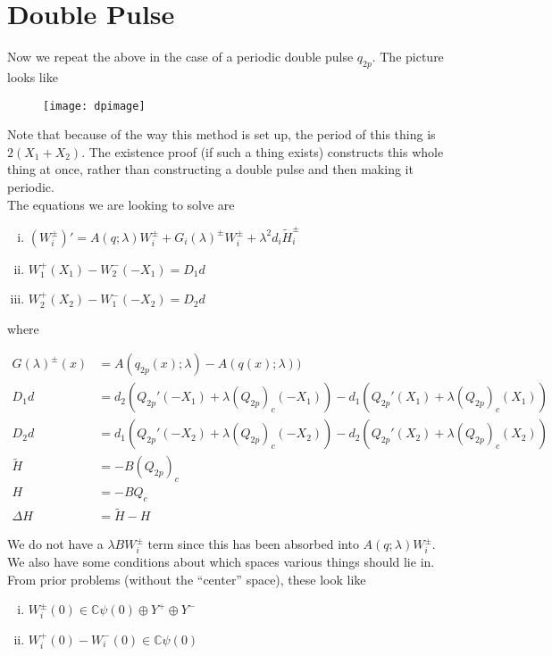 \documentclass[12pt]{article}
\def\C{{\mathbb C}}
\begin{document}
\section*{Double Pulse}

Now we repeat the above in the case of a periodic double pulse $q_{2p}$. The picture looks like

\begin{figure}[H]
\texttt{[image: dpimage]}
\end{figure}

Note that because of the way this method is set up, the period of this thing is $2(X_1 + X_2)$. The existence proof (if such a thing exists) constructs this whole thing at once, rather than constructing a double pulse and then making it periodic. \\

The equations we are looking to solve are

\begin{enumerate}[(i)]
\item $(W_i^\pm)' = A(q; \lambda) W_i^\pm + G_i(\lambda)^\pm W_i^\pm + \lambda^2 d_i \tilde{H}_i^\pm$
\item $W_1^+(X_1) - W_2^-(-X_1) = D_1 d$
\item $W_2^+(X_2) - W_1^-(-X_2) = D_2 d$
\end{enumerate}

where

\begin{align*}
G(\lambda)^\pm (x) &= A(q_{2p}(x);\lambda) - A(q(x);\lambda)) \\
D_1 d &= d_2(Q_{2p}'(-X_1) + \lambda (Q_{2p})_c(-X_1))
- d_1 ( Q_{2p}'(X_1) + \lambda (Q_{2p})_c(X_1) ) \\
D_2 d &= d_1(Q_{2p}'(-X_2) + \lambda (Q_{2p})_c(-X_2))
- d_2 ( Q_{2p}'(X_2) + \lambda (Q_{2p})_c(X_2) ) \\
\tilde{H} &= -B(Q_{2p})_c \\
H &= -B Q_c \\
\Delta H &= \tilde{H} - H
\end{align*}

We do not have a $\lambda B W_i^\pm$ term since this has been absorbed into $A(q; \lambda) W_i^\pm$. \\

We also have some conditions about which spaces various things should lie in. From prior problems (without the ``center'' space), these look like

\begin{enumerate}[(i)]
\item $W_i^\pm(0) \in \C \psi(0) \oplus Y^+ \oplus Y^-$
\item $W_i^+(0) - W_i^-(0) \in \C \psi(0) $
\end{enumerate}
\end{document}
